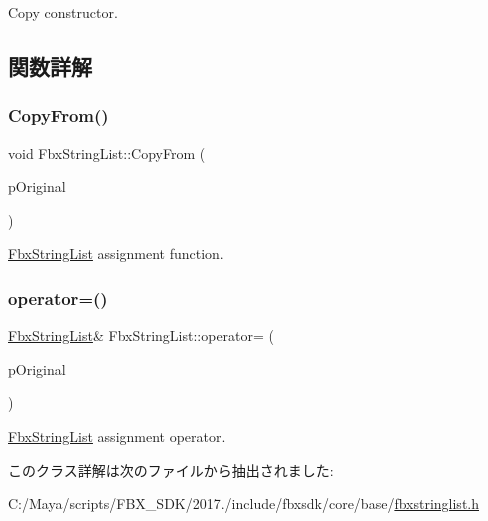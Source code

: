 Copy constructor. 



\subsection{関数詳解}
\mbox{\label{class_fbx_string_list_a7d488c296b284ff595d9ab31b34d4702}} 
\subsubsection{\texorpdfstring{Copy\+From()}{CopyFrom()}}
{\footnotesize\ttfamily void Fbx\+String\+List\+::\+Copy\+From (\begin{DoxyParamCaption}\item[{const \hyperlink{class_fbx_string_list}{Fbx\+String\+List} $\ast$}]{p\+Original }\end{DoxyParamCaption})}



\hyperlink{class_fbx_string_list}{Fbx\+String\+List} assignment function. 

\mbox{\label{class_fbx_string_list_a01f1736c5ba0e59ebfb601e620d8555f}} 
\subsubsection{\texorpdfstring{operator=()}{operator=()}}
{\footnotesize\ttfamily \hyperlink{class_fbx_string_list}{Fbx\+String\+List}\& Fbx\+String\+List\+::operator= (\begin{DoxyParamCaption}\item[{const \hyperlink{class_fbx_string_list}{Fbx\+String\+List} \&}]{p\+Original }\end{DoxyParamCaption})}



\hyperlink{class_fbx_string_list}{Fbx\+String\+List} assignment operator. 



このクラス詳解は次のファイルから抽出されました\+:\begin{DoxyCompactItemize}
\item 
C\+:/\+Maya/scripts/\+F\+B\+X\+\_\+\+S\+D\+K/2017./include/fbxsdk/core/base/\hyperlink{fbxstringlist_8h}{fbxstringlist.\+h}\end{DoxyCompactItemize}
